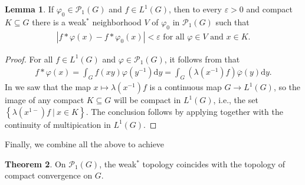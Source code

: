 \documentclass[10pt,twoside,openany,final]{memoir}
\theoremstyle{definition}
\newtheorem{theorem}{Theorem}[chapter]
\newtheorem{lemma}[theorem]{Lemma}
\theoremstyle{Break}
\renewcommand{\P}{\mathcal{P}}
\renewcommand{\d}{\mathrm{d}}
\begin{document}
\begin{lemma}
	If $\varphi_0 \in \P_1(G)$ and $f \in L^1(G)$, then to every $\varepsilon>0$ and compact $K \subseteq G$ there is a weak$^*$ neighborhood $V$ of $\varphi_0$ in $\P_1(G)$ such that
	\begin{align*}
		| f \ast \varphi(x) - f \ast \varphi_0(x)| < \varepsilon \text{ for all } \varphi \in V \text{ and } x \in K.	
	\end{align*}
	\label{3.29}
\end{lemma}
\begin{proof}
	For all $f \in L^1(G)$ and $\varphi \in \P_1(G)$, it follows from  that
	\begin{align*}
		f \ast \varphi(x) = \int_G f(xy) \varphi(y^{-1}) \d y = \int_G (\lambda(x^{-1}) f) \overline{\varphi}(y) \d y.
	\end{align*}
	In  we saw that the map $x \mapsto \lambda(x^{-1}) f$ is a continuous map $G \to L^1(G)$, so the image of any compact $K \subseteq G$ will be compact in $L^1(G)$, i.e., the set $\left\{ \lambda(x^{ 1-}) f \ \big| \ x \in K \right\}$. The conclusion follows by applying  together with the continuity of multipication in $L^1(G)$.
\end{proof}
Finally, we combine all the above to achieve
\begin{theorem}
	On $\P_1(G)$, the weak$^*$ topology coincides with the topology of compact convergence on $G$.	
	\label{3.31}
\end{theorem}
\end{document}
